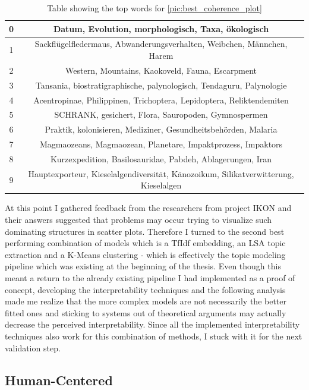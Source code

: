 \begin{table}
	\centering
	\begin{tabular}{c | c}
		0 & Datum, Evolution, morphologisch, Taxa, ökologisch \\ \hline
		1 & Sackflügelfledermaus, Abwanderungsverhalten, Weibchen, Männchen, Harem \\ \hline
		2 & Western, Mountains, Kaokoveld, Fauna, Escarpment \\ \hline
		3 & Tansania, biostratigraphische, palynologisch, Tendaguru, Palynologie \\ \hline
		4 & Acentropinae, Philippinen, Trichoptera, Lepidoptera, Reliktendemiten \\ \hline
		5 & SCHRANK, gesichert, Flora, Sauropoden, Gymnospermen \\ \hline
		6 & Praktik, kolonisieren, Mediziner, Gesundheitsbehörden, Malaria \\ \hline
		7 & Magmaozeans, Magmaozean, Planetare, Impaktprozess, Impaktors \\ \hline
		8 & Kurzexpedition, Basilosauridae, Pabdeh, Ablagerungen, Iran \\ \hline
		9 & Hauptexporteur, Kieselalgendiversität, Känozoikum, Silikatverwitterung, Kieselalgen \\ \hline
	\end{tabular}
	\caption{\label{tab:best_coherence_table} Table showing the top words for {\autoref{pic:best_coherence_plot}}}
\end{table}

At this point I gathered feedback from the researchers from project IKON and their answers suggested that problems may occur trying to visualize such dominating structures in scatter plots.
Therefore I turned to the second best performing combination of models which is a TfIdf embedding, an LSA topic extraction and a K-Means clustering - which is effectively the topic modeling pipeline which was existing at the beginning of the thesis. Even though this meant a return to the already existing pipeline I had implemented as a proof of concept, developing the interpretability techniques and the following analysis made me realize that the more complex models are not necessarily the better fitted ones and sticking to systems out of theoretical arguments may actually decrease the perceived interpretability.
Since all the implemented interpretability techniques also work for this combination of methods, I stuck with it for the next validation step. 

\subsection{Human-Centered}


